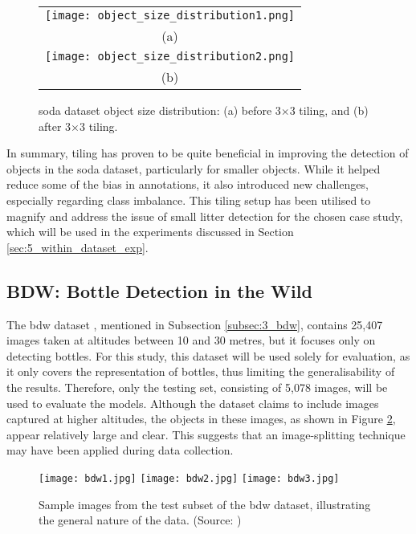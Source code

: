 \begin{figure}[!ht]%
  \centering
  \begin{tabular}{c}
    \texttt{[image: object\_size\_distribution1.png]} \\
    \small (a) \\
    \addlinespace[1em]
    \texttt{[image: object\_size\_distribution2.png]} \\
    \small (b) \\
  \end{tabular}
  \caption{\gls{soda} dataset object size distribution: (a) before 3$\times$3 tiling, and (b) after 3$\times$3 tiling.}
  \label{fig:soda_object_size_distribution}
\end{figure}

In summary, tiling has proven to be quite beneficial in improving the detection of objects in the \gls{soda} dataset, particularly for smaller objects. While it helped reduce some of the bias in annotations, it also introduced new challenges, especially regarding class imbalance. This tiling setup has been utilised to magnify and address the issue of small litter detection for the chosen case study, which will be used in the experiments discussed in Section \ref{sec:5_within_dataset_exp}.


\subsection{BDW: Bottle Detection in the Wild}
\label{subsec:4_bdw}

The \gls{bdw} dataset \cite{bdwdataset}, mentioned in Subsection \ref{subsec:3_bdw}, contains 25,407 images taken at altitudes between 10 and 30 metres, but it focuses only on detecting bottles. For this study, this dataset will be used solely for evaluation, as it only covers the representation of bottles, thus limiting the generalisability of the results. Therefore, only the testing set, consisting of 5,078 images, will be used to evaluate the models. Although the dataset claims to include images captured at higher altitudes, the objects in these images, as shown in Figure \ref{fig:bdw_samples}, appear relatively large and clear. This suggests that an image-splitting technique may have been applied during data collection.

\begin{figure}[!htbp]
  \centering
  \texttt{[image: bdw1.jpg]}
  \hfill
  \texttt{[image: bdw2.jpg]}
  \hfill
  \texttt{[image: bdw3.jpg]}
  \caption{Sample images from the test subset of the \gls{bdw} dataset, illustrating the general nature of the data. (Source: \cite{bdwdataset})}
  \label{fig:bdw_samples}
\end{figure}


